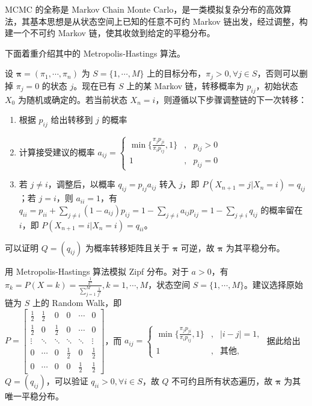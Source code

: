\documentclass[../main.tex]{subfiles}
\begin{document}
MCMC 的全称是 Markov Chain Monte Carlo，是一类模拟复杂分布的高效算法，其基本思想是从状态空间上已知的任意不可约 Markov 链出发，经过调整，构建一个不可约 Markov 链，使其收敛到给定的平稳分布。

下面着重介绍其中的 Metropolis-Hastings 算法。

设 $\boldsymbol\pi=(\pi_1,\cdots,\pi_n)$ 为 $S=\{1,\cdots,M\}$ 上的目标分布，$\pi_j>0,\forall j\in S$，否则可以删掉 $\pi_j=0$ 的状态 $j$。现在已有 $S$ 上的某 Markov 链，转移概率为 $p_{ij}$，初始状态 $X_0$ 为随机或确定的。若当前状态 $X_n=i$，则遵循以下步骤调整链的下一次转移：
\begin{enumerate}
    \item 根据 $p_{ij}$ 给出转移到 $j$ 的概率
    \item 计算接受建议的概率 $a_{ij}=
              \left\{\begin{aligned}
                  \min\{\frac{\pi_jp_{ji}}{\pi_ip_{ij}},1\} & , & p_{ij}>0 \\
                  1                                         & , & p_{ij}=0
              \end{aligned}\right.$
    \item 若 $j\neq i$，调整后，以概率 $q_{ij}=p_{ij}a_{ij}$ 转入 $j$，即 $P(X_{n+1}=j|X_n=i)=q_{ij}$；若 $j=i$，则 $a_{ii}=1$，有 $q_{ii}=p_{ii}+\sum_{j\neq i}(1-a_{ij})p_{ij}=1-\sum_{j\neq i}a_{ij}p_{ij}=1-\sum_{j\neq i}q_{ij}$ 的概率留在 $i$，即 $P(X_{n+1}=i|X_n=i)=q_{ii}$。
\end{enumerate}
可以证明 $Q=(q_{ij})$ 为概率转移矩阵且关于 $\boldsymbol\pi$ 可逆，故 $\boldsymbol\pi$ 为其平稳分布。

\begin{example}
    用 Metropolis-Hastings 算法模拟 Zipf 分布。对于 $a>0$，有 $\pi_k=P(X=k)=\frac{\frac1{k^a}}{\sum_{j=1}^M\frac1{j^a}},k=1,\cdots,M$，状态空间 $S=\{1,\cdots,M\}$。建议选择原始链为 $S$ 上的 Random Walk，即\\
    $P=\left[\begin{matrix}
                \frac12 & \frac12 & 0       & 0       & \cdots  & 0       \\
                \frac12 & 0       & \frac12 & 0       & \cdots  & 0       \\
                \vdots  & \ddots  & \ddots  & \ddots  & \ddots  & \vdots  \\
                0       & \cdots  & 0       & \frac12 & 0       & \frac12 \\
                0       & \cdots  & 0       & 0       & \frac12 & \frac12
            \end{matrix}\right]$，而 $a_{ij}=
        \left\{\begin{aligned}
            \min\{\frac{\pi_jp_{ji}}{\pi_ip_{ij}},1\} & , & |i-j|=1,     \\
            1                                         & , & \text{其他},
        \end{aligned}\right.$ 据此给出 $Q=(q_{ij})$，可以验证 $q_{ii}>0,\forall i\in S$，故 $Q$ 不可约且所有状态遍历，故 $\boldsymbol\pi$ 为其唯一平稳分布。\\
\end{example}
\end{document}
